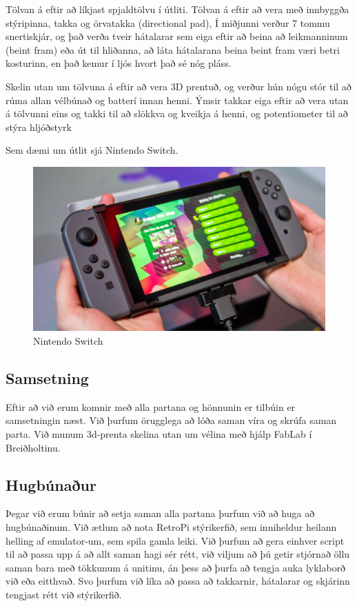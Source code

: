 Tölvan á eftir að líkjast spjaldtölvu í útliti. Tölvan á eftir að vera með innbyggða stýripinna, takka og örvatakka (directional pad), Í miðjunni verður 7 tommu snertiskjár, og það verða tveir hátalarar sem eiga eftir að beina að leikmanninum (beint fram) eða út til hliðanna, að láta hátalarana beina beint fram væri betri kosturinn, en það kemur í ljós hvort það sé nóg pláss.

Skelin utan um tölvuna á eftir að vera 3D prentuð, og verður hún nógu stór til að rúma allan vélbúnað og batterí innan henni. Ýmsir takkar eiga eftir að vera utan á tölvunni eins og takki til að slökkva og kveikja á henni, og potentiometer til að stýra hljóðstyrk

Sem dæmi um útlit sjá Nintendo Switch.

\begin{figure}[h]
	\centering
	\includegraphics[scale=.5]{img/switch}
	\caption{Nintendo Switch}
\end{figure}

\subsection{Samsetning}

Eftir að við erum komnir með alla partana og hönnunin er tilbúin er samsetningin næst. Við þurfum örugglega að lóða saman víra og skrúfa saman parta. Við munum 3d-prenta skelina utan um vélina með hjálp FabLab í Breiðholtinu.

\subsection{Hugbúnaður}

Þegar við erum búnir að setja saman alla partana þurfum við að huga að hugbúnaðinum. Við ætlum að nota RetroPi stýrikerfið, sem inniheldur heilann helling af emulator-um, sem spila gamla leiki. Við þurfum að gera einhver script til að passa upp á að allt saman hagi sér rétt, við viljum að þú getir stjórnað öllu saman bara með tökkunum á unitinu, án þess að þurfa að tengja auka lyklaborð við eða eitthvað. Svo þurfum við líka að passa að takkarnir, hátalarar og skjárinn tengjast rétt við stýrikerfið.

